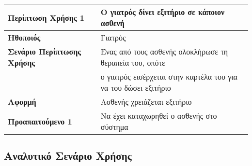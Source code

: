 \documentclass{article}
\newcommand\T{\rule{0pt}{2.6ex}}       %
\newcommand\B{\rule[-1.2ex]{0pt}{0pt}}
\begin{document}
 \begin{center}
     \begin{tabular}{|l|l|}
     \hline
      \textbf{Περίπτωση Χρήσης 1} & Ο γιατρός δίνει εξιτήριο σε κάποιον ασθενή \T\B \\ 
      \hline
      \textbf{Ηθοποιός} & Γιατρός \T\B \\
      \hline
      \textbf{Σενάριο Περίπτωσης Χρήσης} & Ένας από τους ασθενής ολοκλήρωσε τη θεραπεία του, οπότε \T\\& ο γιατρός εισέρχεται στην καρτέλα του για να του δώσει εξιτήριο \B \\
      \hline
      \textbf{Αφορμή} & Ασθενής χρειάζεται εξιτήριο \T\B \\
      \hline
      \textbf{Προαπαιτούμενο 1} & Να έχει καταχωρηθεί ο ασθενής στο σύστημα \T\B \\
      \hline
     \end{tabular}
 \end{center}
 

 \subsection{Αναλυτικό Σενάριο Χρήσης}
 
\end{document}
